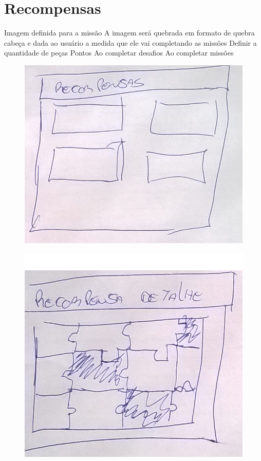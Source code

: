 \documentclass[
	12pt,				%
	oneside,			%
	a4paper,			%
	english,			%
	french,				%
	spanish,			%
	brazil,				%
	]{abntex2}
\begin{document}
\section{Recompensas}

Imagem definida para a missão
A imagem será quebrada em formato de quebra cabeça e dada ao usuário a medida que ele vai completando as missões
Definir a quantidade de peças
Pontos
Ao completar desafios
Ao completar missões

\begin{figure}[ht]
\centering
\includegraphics[width=1\textwidth]{imagens/proposta_recompensa.png}
\end{figure}

\begin{figure}[ht]
\centering
\includegraphics[width=1\textwidth]{imagens/proposta_recompensa_detalhe.png}
\end{figure}
\end{document}
